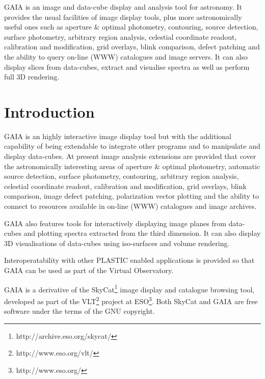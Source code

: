 \documentclass[twoside,11pt]{article}
\newcommand{\stardocinitials}  {SUN}
\newcommand{\stardocnumber}    {214.32}
\newcommand{\stardocabstract} {GAIA is an image and data-cube display 
and analysis tool for astronomy. It provides the usual facilities of image
display tools, plus more astronomically useful ones such as aperture \&
optimal photometry, contouring, source detection, surface photometry,
arbitrary region analysis, celestial coordinate readout, calibration
and modification, grid overlays, blink comparison, defect patching and
the ability to query on-line (WWW) catalogues and image servers. It can 
also display slices from data-cubes, extract and visualise spectra as 
well as perform full 3D rendering.}
\newcommand{\stardocname}{\stardocinitials /\stardocnumber}
\newcommand{\htmladdnormallinkfoot}[2]{#1\footnote{#2}}
\newenvironment{latexonly}{}{}
\newcommand{\xlabel}[1]{}
\renewcommand{\_}{\texttt{\symbol{95}}}
\renewcommand{\thepage}{\roman{page}}
\begin{document}
\stardocabstract
  \newpage
  \begin{latexonly}
    \setlength{\parskip}{0mm}
    \tableofcontents
    \setlength{\parskip}{\medskipamount}
    \markboth{\stardocname}{\stardocname}
  \end{latexonly}
\cleardoublepage
\renewcommand{\thepage}{\arabic{page}}
\setcounter{page}{1}


\section{Introduction\xlabel{introduction}\label{introduction}}

GAIA is an highly interactive image display tool but with the additional
capability of being extendable to integrate other programs and to manipulate
and display data-cubes.  At present image analysis extensions are provided
that cover the astronomically interesting areas of aperture \& optimal
photometry, automatic source detection, surface photometry, contouring,
arbitrary region analysis, celestial coordinate readout, calibration and
modification, grid overlays, blink comparison, image defect patching,
polarization vector plotting and the ability to connect to resources available
in on-line (WWW) catalogues and image archives.

GAIA also features tools for interactively displaying image planes from
data-cubes and plotting spectra extracted from the third dimension. It can
also display 3D visualisations of data-cubes using iso-surfaces and volume
rendering.

Interoperatability with other PLASTIC enabled applications is provided so that
GAIA can be used as part of the Virtual Observatory.

GAIA is a derivative of the
\htmladdnormallinkfoot{SkyCat}{http://archive.eso.org/skycat/} image
display and catalogue browsing tool, developed as part of the
\htmladdnormallinkfoot{VLT}{http://www.eso.org/vlt/} project at
\htmladdnormallinkfoot{ESO}{http://www.eso.org/}. Both SkyCat and GAIA are
free software under the terms of the GNU copyright.
\end{document}
